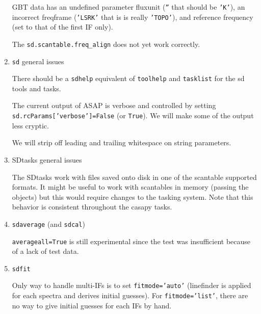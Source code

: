\begin{enumerate}
  GBT data has an undefined parameter fluxunit ({\tt ''} that should be {\tt 'K'}), an 
  incorrect freqframe ({\tt 'LSRK'} that is is really {\tt 'TOPO'}), and reference
  frequency (set to that of the first IF only).


  The {\tt sd.scantable.freq\_align} does not yet work correctly.


\item {\tt sd} general issues

  There should be a {\tt sdhelp} equivalent of {\tt toolhelp}
  and {\tt tasklist} for the sd tools and tasks.

  The current output of ASAP is verbose and controlled by
  setting {\tt sd.rcParams['verbose']=False} (or {\tt True}).
  We will make some of the output less cryptic.

  We will strip off leading and trailing whitespace on string parameters.

\item SDtasks general issues

  The SDtasks work with files saved onto disk in one of the 
  scantable supported formats.  It might be useful to
  work with scantables in memory (passing the objects) but this
  would require changes to the tasking system.  Note that this
  behavior is consistent throughout the casapy tasks.


\item {\tt sdaverage} (and {\tt sdcal})

  {\tt averageall=True} is still experimental since the test was insufficient 
  because of a lack of test data.

% 

\item {\tt sdfit}

%
Only way to handle multi-IFs is to set {\tt fitmode='auto'}
(linefinder is applied for each spectra and derives initial guesses).
For {\tt fitmode='list'}, there are no way to give initial guesses for each IFs by hand.


\end{enumerate}
